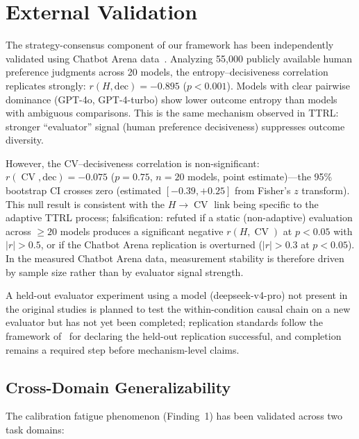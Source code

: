 \documentclass[11pt]{article}
\DeclareMathOperator{\CV}{CV}
\begin{document}
\section{External Validation}

The strategy-consensus component of our framework has been independently validated using Chatbot Arena data~\cite{zheng2023chatbot,chiang2024chatbot}. Analyzing 55,000 publicly available human preference judgments across 20 models, the entropy--decisiveness correlation replicates strongly: $r(H, \text{dec}) = -0.895$ ($p < 0.001$). Models with clear pairwise dominance (GPT-4o, GPT-4-turbo) show lower outcome entropy than models with ambiguous comparisons. This is the same mechanism observed in TTRL: stronger ``evaluator'' signal (human preference decisiveness) suppresses outcome diversity.

However, the CV--decisiveness correlation is non-significant: $r(\CV, \text{dec}) = -0.075$ ($p = 0.75$, $n = 20$ models, point estimate)---the 95\% bootstrap CI crosses zero (estimated $[-0.39, +0.25]$ from Fisher's $z$ transform). This null result is consistent with the $H \to \CV$ link being specific to the adaptive TTRL process; falsification: refuted if a static (non-adaptive) evaluation across $\geq 20$ models produces a significant negative $r(H, \CV)$ at $p < 0.05$ with $|r| > 0.5$, or if the Chatbot Arena replication is overturned ($|r| > 0.3$ at $p < 0.05$). In the measured Chatbot Arena data, measurement stability is therefore driven by sample size rather than by evaluator signal strength.

A held-out evaluator experiment using a model (deepseek-v4-pro) not present in the original studies is planned to test the within-condition causal chain on a new evaluator but has not yet been completed; replication standards follow the framework of~\citet{ioannidis2005most,button2013power} for declaring the held-out replication successful, and completion remains a required step before mechanism-level claims.

\subsection{Cross-Domain Generalizability}

The calibration fatigue phenomenon (Finding~1) has been validated across two task domains:
\end{document}

